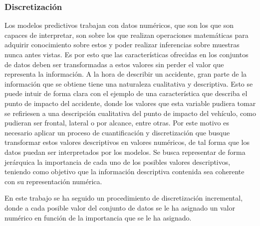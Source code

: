 \documentclass{uathesis-es}
\begin{document}
	
	\subsubsection{Discretización}
	
	Los modelos predictivos trabajan con datos numéricos, que son los que son capaces de interpretar, son sobre los que realizan operaciones matemáticas para adquirir conocimiento sobre estos y poder realizar inferencias sobre muestras nunca antes vistas. Es por esto que las características ofrecidas en los conjuntos de datos deben ser transformadas a estos valores sin perder el valor que representa la información. A la hora de describir un accidente, gran parte de la información que se obtiene tiene una naturaleza cualitativa y descriptiva. Esto se puede intuir de forma clara con el ejemplo de una característica que describa el punto de impacto del accidente, donde los valores que esta variable pudiera tomar se refiriesen a una descripción cualitativa del punto de impacto del vehículo, como pudieran ser frontal, lateral o por alcance, entre otras. Por este motivo es necesario aplicar un proceso de cuantificación y discretización que busque transformar estos valores descriptivos en valores numéricos, de tal forma que los datos puedan ser interpretados por los modelos. Se busca representar de forma jerárquica la importancia de cada uno de los posibles valores descriptivos, teniendo como objetivo que la información descriptiva contenida sea coherente con su representación numérica.
	
	
	En este trabajo se ha seguido un procedimiento de discretización incremental, donde a cada posible valor del conjunto de datos se le ha asignado un valor numérico en función de la importancia que se le ha asignado.
	
	
\end{document}
